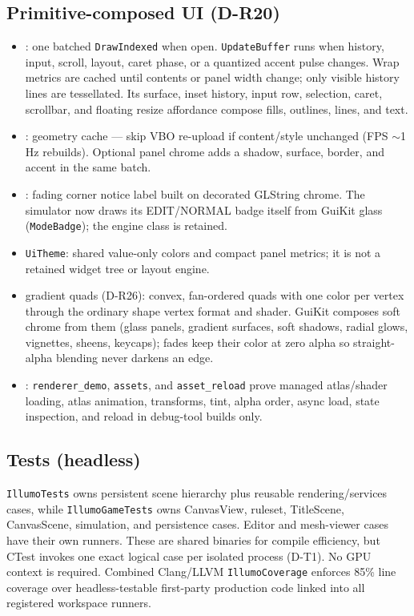 \subsection{Primitive-composed UI (D-R20)}
\begin{itemize}
  \item {}: one batched \texttt{DrawIndexed} when open.
        \texttt{UpdateBuffer} runs when history, input, scroll, layout, caret
        phase, or a quantized accent pulse changes. Wrap metrics are cached
        until contents or panel width change; only visible history lines are
        tessellated. Its surface, inset history, input row,
        selection, caret, scrollbar, and floating resize affordance compose
         fills, outlines, lines, and text.
  \item {}: geometry cache --- skip VBO re-upload if
        content/style unchanged (FPS $\sim$1\,Hz rebuilds). Optional panel
        chrome adds a shadow, surface, border, and accent in the same batch.
  \item {}: fading corner notice label built on decorated
        GLString chrome. The simulator now draws its EDIT/NORMAL badge itself
        from GuiKit glass (\texttt{ModeBadge}); the engine class is retained.
  \item \texttt{UiTheme}: shared value-only colors and compact panel metrics;
        it is not a retained widget tree or layout engine.
  \item {} gradient quads (D-R26): convex, fan-ordered
        quads with one color per vertex through the ordinary shape vertex
        format and shader. GuiKit composes soft chrome from them (glass
        panels, gradient surfaces, soft shadows, radial glows, vignettes,
        sheens, keycaps); fades keep their color at zero alpha so
        straight-alpha blending never darkens an edge.
  \item {}: \texttt{renderer\_demo}, \texttt{assets}, and
        \texttt{asset\_reload} prove managed atlas/shader loading, atlas
        animation, transforms, tint, alpha order, async load, state inspection,
        and reload in debug-tool builds only.
\end{itemize}

\subsection{Tests (headless)}
\texttt{IllumoTests} owns persistent scene hierarchy plus reusable
rendering/services cases, while
\texttt{IllumoGameTests} owns CanvasView, ruleset, TitleScene, CanvasScene,
simulation, and persistence cases. Editor and mesh-viewer cases have their own runners.
These are shared binaries for compile efficiency, but
CTest invokes one exact logical case per isolated process (D-T1). No GPU
context is required. Combined Clang/LLVM \texttt{IllumoCoverage} enforces 85\%
line coverage over headless-testable first-party production code linked into
all registered workspace runners.

